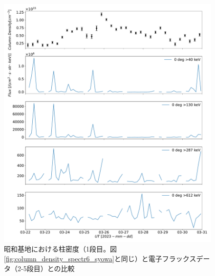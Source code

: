 \begin{figure}[htbp]
    \centering
    \includegraphics[width=\linewidth]{master_thesis_contents/master_thesis_fig/column_density_spectr6_poes0deg_syowa.pdf}
    \caption{昭和基地における柱密度（1段目。図\ref{fig:column_density_spectr6_syowa}と同じ）と電子フラックスデータ（2-5段目）との比較}
    \label{fig:ele_mmcd_syowa}
\end{figure}
